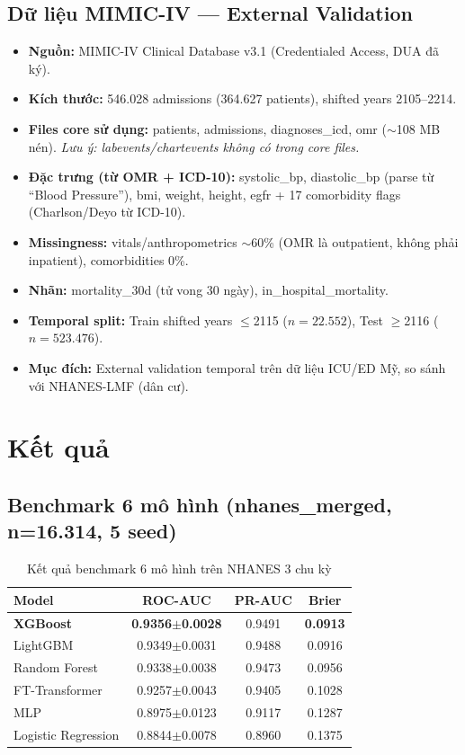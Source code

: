 \documentclass[13pt,a4paper]{article}
\begin{document}
\subsection{Dữ liệu MIMIC-IV — External Validation}

\begin{itemize}
    \item \textbf{Nguồn:} MIMIC-IV Clinical Database v3.1 (Credentialed Access, DUA đã ký).
    \item \textbf{Kích thước:} 546.028 admissions (364.627 patients), shifted years 2105--2214.
    \item \textbf{Files core sử dụng:} patients, admissions, diagnoses\_icd, omr ($\sim$108 MB nén). \textit{Lưu ý: labevents/chartevents không có trong core files.}
    \item \textbf{Đặc trưng (từ OMR + ICD-10):} systolic\_bp, diastolic\_bp (parse từ ``Blood Pressure''), bmi, weight, height, egfr + 17 comorbidity flags (Charlson/Deyo từ ICD-10).
    \item \textbf{Missingness:} vitals/anthropometrics $\sim$60\% (OMR là outpatient, không phải inpatient), comorbidities 0\%.
    \item \textbf{Nhãn:} mortality\_30d (tử vong 30 ngày), in\_hospital\_mortality.
    \item \textbf{Temporal split:} Train shifted years $\le$2115 ($n=22.552$), Test $\ge$2116 ($n=523.476$).
    \item \textbf{Mục đích:} External validation temporal trên dữ liệu ICU/ED Mỹ, so sánh với NHANES-LMF (dân cư).
\end{itemize}

\section{Kết quả}

\subsection{Benchmark 6 mô hình (nhanes\_merged, n=16.314, 5 seed)}

\begin{table}[H]
\centering
\caption{Kết quả benchmark 6 mô hình trên NHANES 3 chu kỳ}
\label{tab:benchmark}
\begin{tabular}{lccc}
\toprule
Model & ROC-AUC & PR-AUC & Brier \\
\midrule
\textbf{XGBoost} & \textbf{0.9356$\pm$0.0028} & 0.9491 & \textbf{0.0913} \\
LightGBM & 0.9349$\pm$0.0031 & 0.9488 & 0.0916 \\
Random Forest & 0.9338$\pm$0.0038 & 0.9473 & 0.0956 \\
FT-Transformer & 0.9257$\pm$0.0043 & 0.9405 & 0.1028 \\
MLP & 0.8975$\pm$0.0123 & 0.9117 & 0.1287 \\
Logistic Regression & 0.8844$\pm$0.0078 & 0.8960 & 0.1375 \\
\bottomrule
\end{tabular}
\end{table}
\end{document}
